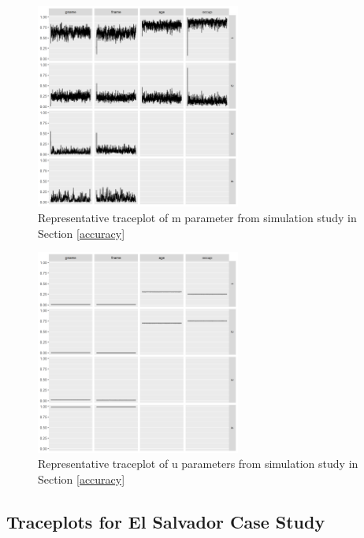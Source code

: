 \documentclass[12pt,letterpaper]{article}
\newcommand{\1}[1]{\mathbb{I}\!\left[#1\right]} %
\begin{document}
\begin{figure}[!h]
	\begin{center}
		\includegraphics[width=0.6\textwidth]{../notes/figures/sim_m_trace} 
		\caption{Representative traceplot of m parameter from simulation study in Section \ref{accuracy}}\label{fig:sim_m_trace}
	\end{center}
\end{figure}

\begin{figure}[!h]
	\begin{center}
		\includegraphics[width=0.6\textwidth]{../notes/figures/sim_u_trace} 
		\caption{Representative traceplot of u parameters from simulation study in Section \ref{accuracy}}\label{fig:sim_u_trace}
	\end{center}
\end{figure}

\clearpage

\hypertarget{appendix-es}{%
	\subsection{Traceplots for El Salvador Case Study}\label{app:appendix-es}}
\end{document}

